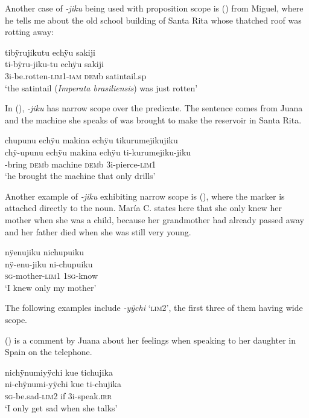Another case of \textit{-jiku} being used with proposition scope is () from Miguel, where he tells me about the old school building of Santa Rita whose thatched roof was rotting away:

\ea\label{ex:jiku-4}
\begingl
\glpreamble tibÿrujikutu echÿu sakiji\\
\gla ti-bÿru-jiku-tu echÿu sakiji\\
\glb 3i-be.rotten-\textsc{lim}1-\textsc{iam} \textsc{dem}b satintail.sp\\
\glft ‘the satintail (\textit{Imperata brasiliensis}) was just rotten’
\endgl
\trailingcitation{[mxx-p110825l.090]}
\xe

In (), \textit{-jiku} has narrow scope over the predicate. The sentence comes from Juana and the machine she speaks of was brought to make the reservoir in Santa Rita.

\ea\label{ex:jiku-3}
\begingl
\glpreamble chupunu echÿu makina echÿu tikurumejikujiku\\
\gla chÿ-upunu echÿu makina echÿu ti-kurumejiku-jiku\\
-bring \textsc{dem}b machine \textsc{dem}b 3i-pierce-\textsc{lim}1\\
\glft ‘he brought the machine that only drills’
\endgl
\trailingcitation{[jxx-p120515l-2.215]}
\xe

Another example of \textit{-jiku} exhibiting narrow scope is (), where the marker is attached directly to the noun. María C. states here that she only knew her mother when she was a child, because her grandmother had already passed away and her father died when she was still very young.

\ea\label{ex:jiku-5}
\begingl
\glpreamble nÿenujiku nichupuiku\\
\gla nÿ-enu-jiku ni-chupuiku\\
\textsc{sg}-mother-\textsc{lim}1 1\textsc{sg}-know\\
\glft ‘I knew only my mother'
\endgl
\trailingcitation{[ump-p110815sf.147]}
\xe

The following examples include \textit{-yÿchi} ‘\textsc{lim}2’, the first three of them having wide scope.

() is a comment by Juana about her feelings when speaking to her daughter in Spain on the telephone.

\ea\label{ex:lim2-1}
\begingl
\glpreamble nichÿnumiyÿchi kue tichujika\\
\gla ni-chÿnumi-yÿchi kue ti-chujika\\
\textsc{sg}-be.sad-\textsc{lim}2 if 3i-speak.\textsc{irr}\\
\glft ‘I only get sad when she talks’
\endgl
\trailingcitation{[jxx-p120430l-1.307]}
\xe

